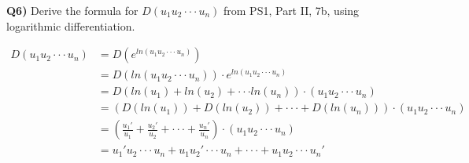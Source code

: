 \documentclass[9pt]{article}
\begin{document}
\begin{tcolorbox}
  \textbf{Q6)} Derive the formula for $D(u_1u_2 \cdot \cdot \cdot u_n)$ from PS1, Part II, 7b, using logarithmic differentiation.
\end{tcolorbox}
\begin{align*}
  D(u_1u_2 \cdot \cdot \cdot u_n) &= D(e^{ln(u_1u_2 \cdot \cdot \cdot u_n)})\\
                                  &= D(ln(u_1u_2 \cdot \cdot \cdot u_n)) \cdot e^{ln(u_1u_2 \cdot \cdot \cdot u_n)}\\
                                  &= D(ln(u_1) + ln(u_2) + \cdot \cdot \cdot ln(u_n)) \cdot (u_1 u_2 \cdot \cdot \cdot u_n)\\
                                  &= (D(ln(u_1)) + D(ln(u_2)) + \cdot \cdot \cdot + D(ln(u_n))) \cdot (u_1 u_2 \cdot \cdot \cdot u_n)\\
                                  &= (\frac{u_1'}{u_1} + \frac{u_2'}{u_2} + \cdot \cdot \cdot + \frac{u_n'}{u_n}) \cdot (u_1 u_2 \cdot \cdot \cdot u_n)\\
                                  &= u_1' u_2 \cdot \cdot \cdot u_n + u_1 u_2' \cdot \cdot \cdot u_n + \cdot \cdot \cdot + u_1 u_2 \cdot \cdot \cdot u_n'
\end{align*}
\end{document}
